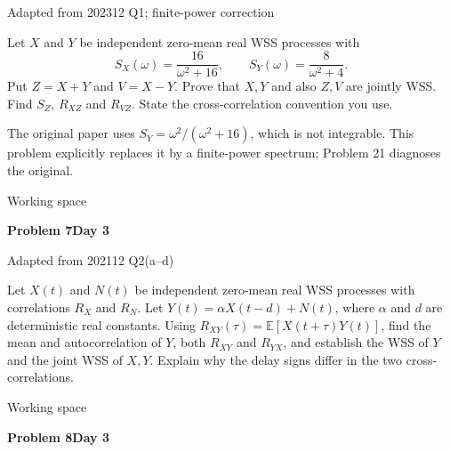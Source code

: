 \documentclass[11pt]{article}
\newcommand{\E}{\mathbb E}\newcommand{\ee}{\mathrm e}\newcommand{\jj}{\mathrm j}
\newcommand{\qtitle}[2]{\clearpage\begin{tcolorbox}[colback=navy,colframe=navy,arc=1.5pt,boxrule=0pt]\color{white}\large\bfseries #1\hfill\small #2\end{tcolorbox}}
\begin{document}
{\small\color{accentred}Adapted from 202312 Q1; finite-power correction}\par{}\par{}\par\smallskip\begin{tcolorbox}[colback=qbg,colframe=qbg,boxrule=0pt]Let $X$ and $Y$ be independent zero-mean real WSS processes with
\[S_X(\omega)=\frac{16}{\omega^2+16},\qquad S_Y(\omega)=\frac8{\omega^2+4}.\]
Put $Z=X+Y$ and $V=X-Y$. Prove that $X,Y$ and also $Z,V$ are jointly WSS. Find $S_Z$, $R_{XZ}$ and $R_{VZ}$. State the cross-correlation convention you use.
\par The original paper uses $S_Y=\omega^2/(\omega^2+16)$, which is not integrable. This problem explicitly replaces it by a finite-power spectrum; Problem 21 diagnoses the original.\end{tcolorbox}\smallskip\begin{workspace}\hfill{\color{linec}\footnotesize Working space}\end{workspace}
\qtitle{Problem 7}{Day 3}
{\small\color{accentred}Adapted from 202112 Q2(a--d)}\par{}\par{}\par\smallskip\begin{tcolorbox}[colback=qbg,colframe=qbg,boxrule=0pt]Let $X(t)$ and $N(t)$ be independent zero-mean real WSS processes with correlations $R_X$ and $R_N$. Let $Y(t)=\alpha X(t-d)+N(t)$, where $\alpha$ and $d$ are deterministic real constants. Using $R_{XY}(\tau)=\E[X(t+\tau)Y(t)]$, find the mean and autocorrelation of $Y$, both $R_{XY}$ and $R_{YX}$, and establish the WSS of $Y$ and the joint WSS of $X,Y$. Explain why the delay signs differ in the two cross-correlations.\end{tcolorbox}\smallskip\begin{workspace}\hfill{\color{linec}\footnotesize Working space}\end{workspace}
\qtitle{Problem 8}{Day 3}
\end{document}
